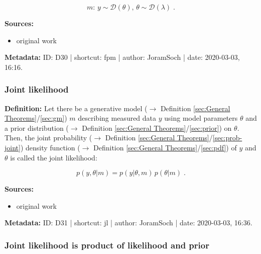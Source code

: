 \documentclass[a4paper,12pt,twoside]{book}
\begin{document}
\begin{equation} \label{eq:fpm-fpm}
m: \, y \sim \mathcal{D}(\theta), \, \theta \sim \mathcal{D}(\lambda) \; .
\end{equation}


\vspace{1em}
\textbf{Sources:}
\begin{itemize}
\item original work\end{itemize}


\vspace{1em}
\textbf{Metadata:} ID: D30 | shortcut: fpm | author: JoramSoch | date: 2020-03-03, 16:16.
\vspace{1em}



\subsubsection[\textit{Joint likelihood}]{Joint likelihood} \label{sec:jl}
\setcounter{equation}{0}

\textbf{Definition:} Let there be a generative model ($\rightarrow$ Definition \ref{sec:General Theorems}/\ref{sec:gm}) $m$ describing measured data $y$ using model parameters $\theta$ and a prior distribution ($\rightarrow$ Definition \ref{sec:General Theorems}/\ref{sec:prior}) on $\theta$. Then, the joint probability ($\rightarrow$ Definition \ref{sec:General Theorems}/\ref{sec:prob-joint}) density function ($\rightarrow$ Definition \ref{sec:General Theorems}/\ref{sec:pdf}) of $y$ and $\theta$ is called the joint likelihood:

\begin{equation} \label{eq:jl-jl}
p(y,\theta|m) = p(y|\theta,m) \, p(\theta|m) \; .
\end{equation}


\vspace{1em}
\textbf{Sources:}
\begin{itemize}
\item original work\end{itemize}


\vspace{1em}
\textbf{Metadata:} ID: D31 | shortcut: jl | author: JoramSoch | date: 2020-03-03, 16:36.
\vspace{1em}



\subsubsection[\textbf{Joint likelihood is product of likelihood and prior}]{Joint likelihood is product of likelihood and prior} \label{sec:jl-lfnprior}
\setcounter{equation}{0}
\end{document}
